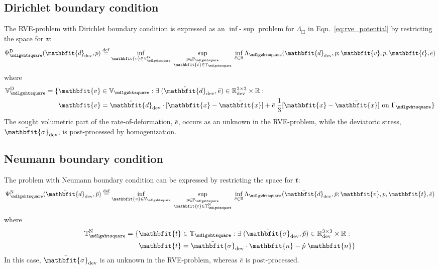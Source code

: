 \documentclass[notitlepage,a4paper,fleqn,9pt]{extarticle}
\renewcommand{\ta}[1]{\mathbfit{#1}}
\renewcommand{\ts}[1]{\mathbfit{#1}}
\renewcommand{\Box}{\mdlgwhtsquare}
\begin{document}
\begin{multicols}{2}
\subsection{Dirichlet boundary condition}
The RVE-problem with Dirichlet boundary condition is expressed as an $\inf$-$\sup$ problem for $\Lambda_\Box$ in Eqn.~\eqref{eq:rve_potential} by restricting the space for $\ta v$:
\begin{align}
\label{eq:dirichlet_potential}
 \Psi^\Dirichlet_\Box(\bar{\ts d}_\dev, \bar{p} ) \defeq
    \inf_{\ta v \in \set V_\Box^\Dirichlet } \;
    \sup_{\substack{ p\in \set P_\Box \\ \ta t \in \set{T}_\Box }} \;
    \inf_{\bar{e} \in \set{R}}
    \Lambda_\Box(\bar{\ts d}_\dev, \bar{p}; \ta v, p, \ta t, \bar{e})
\end{align}
where
\begin{align}
 \set{V}_\Box^\Dirichlet = \{ &\ta v \in \set{V}_\Box : \exists\; (\hat{\ts d}_\dev,\bar{e}) \in \set{R}^{3\times 3}_\dev \times \set{R} :
\nonumber\\
  & \ta v = \hat{\ts d}_\dev\cdot[\ta x - \bar{\ta x}] + \bar{e}\;\frac13 [\ta x - \bar{\ta x}] \text{ on }\Gamma_\Box \}
\end{align}
The sought volumetric part of the rate-of-deformation, $\bar{e}$, occurs as an unknown in the RVE-problem, while the deviatoric stress, $\bar{\ts\sigma}_\dev$, is post-processed by homogenization.

\subsection{Neumann boundary condition}
The problem with Neumann boundary condition can be expressed by restricting the space for $\ta t$:
\begin{align}
 \Psi^\Neumann_\Box(\bar{\ts d}_\dev, \bar{p} ) \defeq
    \inf_{\ta v \in \set V_\Box } \;
    \sup_{\substack{p\in \set P_\Box \\ \ta t \in \set T_\Box^\Neumann }} \;
    \inf_{\bar{e} \in \set{R} }
    \Lambda_\Box(\bar{\ts d}_\dev, \bar p; \ta v, p, \ta t, \bar{e})
\end{align}
where
\begin{align}
 \set T_\Box^\Neumann = \{ &\ta t \in \set{T}_\Box: \exists\; (\bar{\ts\sigma}_\dev, \hat{p}) \in \set{R}^{3\times 3}_\dev \times \set{R} :
\nonumber\\
 & \ta t = \bar{\ts\sigma}_\dev\cdot\ta n - \hat{p}\;\ta n \}
\end{align}
In this case, $\bar{\ts\sigma}_\dev$ is an unknown in the RVE-problem, whereas $\bar{e}$ is post-processed.




\end{multicols}
\end{document}
